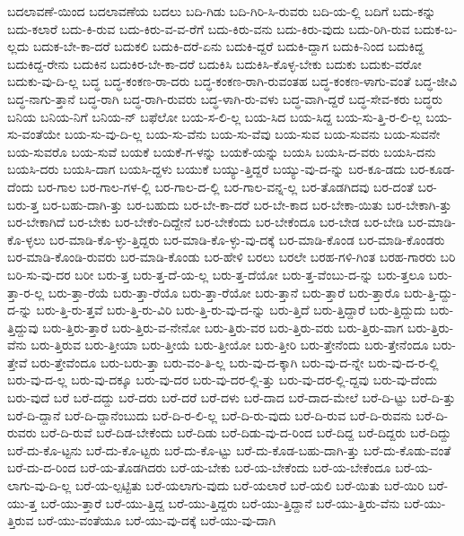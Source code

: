 {ಬದಲಾವಣೆ-ಯಿಂದ
ಬದಲಾವಣೆಯ
ಬದಲು
ಬದಿ-ಗಿಡು
ಬದಿ-ಗಿರಿ-ಸಿ-ರುವರು
ಬದಿ-ಯ-ಲ್ಲಿ
ಬದಿಗೆ
ಬದು-ಕನ್ನು
ಬದು-ಕಲಾರೆ
ಬದು-ಕಿ-ರುವ
ಬದು-ಕಿರು-ವ-ವ-ರೆಗೆ
ಬದು-ಕಿರು-ವನು
ಬದು-ಕಿರು-ವುದು
ಬದು-ರಿಗಿ-ರುವ
ಬದುಕ-ಬ-ಲ್ಲದು
ಬದುಕ-ಬೇ-ಕಾ-ದರೆ
ಬದುಕಲಿ
ಬದುಕಿ-ದರೆ-ಏನು
ಬದುಕಿ-ದ್ದರೆ
ಬದುಕಿ-ದ್ದಾಗ
ಬದುಕಿ-ನಿಂದ
ಬದುಕಿದ್ದ
ಬದುಕಿದ್ದ-ರೇನು
ಬದುಕಿನ
ಬದುಕಿರ-ಬೇ-ಕಾ-ದರೆ
ಬದುಕಿಸಿ
ಬದುಕಿಸಿ-ಕೊಳ್ಳ-ಬೇಕು
ಬದುಕು
ಬದುಕು-ವರೋ
ಬದುಕು-ವು-ದಿ-ಲ್ಲ
ಬದ್ಧ
ಬದ್ಧ-ಕಂಕಣ-ರಾ-ದರು
ಬದ್ಧ-ಕಂಕಣ-ರಾಗಿ-ರುವಂತಹ
ಬದ್ಧ-ಕಂಕಣ-ಳಾಗು-ವಂತೆ
ಬದ್ಧ-ಜೀವಿ
ಬದ್ಧ-ನಾಗು-ತ್ತಾನೆ
ಬದ್ಧ-ರಾಗಿ
ಬದ್ಧ-ರಾಗಿ-ರುವರು
ಬದ್ಧ-ಳಾಗಿ-ರು-ವಳು
ಬದ್ಧ-ವಾಗಿ-ದ್ದರೆ
ಬದ್ಧ-ಸೇವ-ಕರು
ಬದ್ಧರು
ಬನಿಯ
ಬನಿಯ-ನಿಗೆ
ಬನಿಯ-ನ್
ಬಫೆಲೋ
ಬಯ-ಸ-ಲಿ-ಲ್ಲ
ಬಯ-ಸಿದ
ಬಯ-ಸಿದ್ದ
ಬಯ-ಸು-ತ್ತಿ-ರ-ಲಿ-ಲ್ಲ
ಬಯ-ಸು-ವಂತೆಯೇ
ಬಯ-ಸು-ವು-ದಿ-ಲ್ಲ
ಬಯ-ಸು-ವೆನು
ಬಯ-ಸು-ವೆವು
ಬಯ-ಸುವ
ಬಯ-ಸುವನು
ಬಯ-ಸುವನೇ
ಬಯ-ಸುವರೊ
ಬಯ-ಸುವೆ
ಬಯಕೆ
ಬಯಕೆ-ಗ-ಳನ್ನು
ಬಯಕೆ-ಯನ್ನು
ಬಯಸಿ
ಬಯಸಿ-ದ-ವರು
ಬಯಸಿ-ದನು
ಬಯಸಿ-ದರು
ಬಯಸಿ-ದಾಗ
ಬಯಸಿ-ದ್ದಳು
ಬಯುಕೆ
ಬಯ್ಯು-ತ್ತಿದ್ದರೆ
ಬಯ್ಯು-ವು-ದ-ನ್ನು
ಬರ-ಕೂ-ಡದು
ಬರ-ಕೂಡ-ದೆಂದು
ಬರ-ಗಾಲ
ಬರ-ಗಾಲ-ಗಳ-ಲ್ಲಿ
ಬರ-ಗಾಲ-ದ-ಲ್ಲಿ
ಬರ-ಗಾಲ-ವನ್ನ-ಲ್ಲ
ಬರ-ತೊಡಗಿದವು
ಬರ-ದಂತೆ
ಬರ-ಬರು-ತ್ತ
ಬರ-ಬಹು-ದಾಗಿ-ತ್ತು
ಬರ-ಬಹುದು
ಬರ-ಬೇ-ಕಾ-ದರೆ
ಬರ-ಬೇ-ಕಾದ
ಬರ-ಬೇಕಾ-ಯಿತು
ಬರ-ಬೇಕಾಗಿ-ತ್ತು
ಬರ-ಬೇಕಾಗಿದೆ
ಬರ-ಬೇಕು
ಬರ-ಬೇಕೆಂ-ದಿದ್ದೇನೆ
ಬರ-ಬೇಕೆಂದು
ಬರ-ಬೇಕೆಂದೂ
ಬರ-ಬೇಡ
ಬರ-ಬೇಡಿ
ಬರ-ಮಾಡಿ-ಕೊ-ಳ್ಳಲು
ಬರ-ಮಾಡಿ-ಕೊ-ಳ್ಳು-ತ್ತಿದ್ದರು
ಬರ-ಮಾಡಿ-ಕೊ-ಳ್ಳು-ವು-ದಕ್ಕೆ
ಬರ-ಮಾಡಿ-ಕೊಂಡ
ಬರ-ಮಾಡಿ-ಕೊಂಡರು
ಬರ-ಮಾಡಿ-ಕೊಂಡಿ-ರುವರು
ಬರ-ಮಾಡಿ-ಕೊಂಡು
ಬರ-ಹೇಳಿ
ಬರಲು
ಬರಲೇ
ಬರಹ-ಗಳಿ-ಗಿಂತ
ಬರಹ-ಗಾರರು
ಬರಿ
ಬರಿ-ಸು-ವು-ದರ
ಬರೀ
ಬರು-ತ್ತ
ಬರು-ತ್ತ-ದೆ-ಯ-ಲ್ಲ
ಬರು-ತ್ತ-ದೆಯೋ
ಬರು-ತ್ತ-ವೆಂಬು-ದ-ನ್ನು
ಬರು-ತ್ತಲೂ
ಬರು-ತ್ತಾ-ರ-ಲ್ಲ
ಬರು-ತ್ತಾ-ರೆಯೆ
ಬರು-ತ್ತಾ-ರೆಯೊ
ಬರು-ತ್ತಾ-ರೆಯೋ
ಬರು-ತ್ತಾನೆ
ಬರು-ತ್ತಾರೆ
ಬರು-ತ್ತಾರೊ
ಬರು-ತ್ತಿ-ದ್ದು-ದ-ನ್ನು
ಬರು-ತ್ತಿ-ರು-ತ್ತವೆ
ಬರು-ತ್ತಿ-ರು-ವಿರಿ
ಬರು-ತ್ತಿ-ರು-ವು-ದ-ನ್ನು
ಬರು-ತ್ತಿದೆ
ಬರು-ತ್ತಿದ್ದಾರೆ
ಬರು-ತ್ತಿದ್ದುದು
ಬರು-ತ್ತಿದ್ದುವು
ಬರು-ತ್ತಿರು-ತ್ತಾರೆ
ಬರು-ತ್ತಿರು-ವ-ನೇನೋ
ಬರು-ತ್ತಿರು-ವರ
ಬರು-ತ್ತಿರು-ವರು
ಬರು-ತ್ತಿರು-ವಾಗ
ಬರು-ತ್ತಿರು-ವೆನು
ಬರು-ತ್ತಿರುವ
ಬರು-ತ್ತೀಯಾ
ಬರು-ತ್ತೀಯೆ
ಬರು-ತ್ತೀಯೋ
ಬರು-ತ್ತೀರಿ
ಬರು-ತ್ತೇನೆಂದು
ಬರು-ತ್ತೇನೆಂದೂ
ಬರು-ತ್ತೇವೆ
ಬರು-ತ್ತೇವೆಂದೂ
ಬರು-ಬರು-ತ್ತಾ
ಬರು-ವಂ-ತಿ-ಲ್ಲ
ಬರು-ವು-ದ-ಕ್ಕಾಗಿ
ಬರು-ವು-ದ-ನ್ನೇ
ಬರು-ವು-ದ-ರ-ಲ್ಲಿ
ಬರು-ವು-ದ-ಲ್ಲ
ಬರು-ವು-ದಕ್ಕೂ
ಬರು-ವು-ದರ
ಬರು-ವು-ದರ-ಲ್ಲಿ-ತ್ತು
ಬರು-ವು-ದರ-ಲ್ಲಿ-ದ್ದವು
ಬರು-ವು-ದೆಂದು
ಬರು-ವುದೆ
ಬರೆ
ಬರೆ-ದದ್ದು
ಬರೆ-ದರು
ಬರೆ-ದರೆ
ಬರೆ-ದಳು
ಬರೆ-ದಾದ
ಬರೆ-ದಾದ-ಮೇಲೆ
ಬರೆ-ದಿ-ಟ್ಟು
ಬರೆ-ದಿ-ತ್ತು
ಬರೆ-ದಿ-ದ್ದಾನೆ
ಬರೆ-ದಿ-ದ್ದಾನೆಂಬುದು
ಬರೆ-ದಿ-ರ-ಲಿ-ಲ್ಲ
ಬರೆ-ದಿ-ರು-ವುದು
ಬರೆ-ದಿ-ರುವ
ಬರೆ-ದಿ-ರುವನು
ಬರೆ-ದಿ-ರುವರು
ಬರೆ-ದಿ-ರುವೆ
ಬರೆ-ದಿಡ-ಬೇಕೆಂದು
ಬರೆ-ದಿಡು
ಬರೆ-ದಿಡು-ವು-ದ-ರಿಂದ
ಬರೆ-ದಿದ್ದ
ಬರೆ-ದಿದ್ದರು
ಬರೆ-ದಿದ್ದು
ಬರೆ-ದು-ಕೊ-ಟ್ಟನು
ಬರೆ-ದು-ಕೊ-ಟ್ಟರು
ಬರೆ-ದು-ಕೊ-ಟ್ಟು
ಬರೆ-ದು-ಕೊಡ-ಬಹು-ದಾಗಿ-ತ್ತು
ಬರೆ-ದು-ಕೊಡು-ವಂತೆ
ಬರೆ-ದು-ದ-ರಿಂದ
ಬರೆ-ಯ-ತೊಡಗಿದರು
ಬರೆ-ಯ-ಬೇಕು
ಬರೆ-ಯ-ಬೇಕೆಂದು
ಬರೆ-ಯ-ಬೇಕೆಂದೂ
ಬರೆ-ಯ-ಲಾಗು-ವು-ದಿ-ಲ್ಲ
ಬರೆ-ಯ-ಲ್ಪಟ್ಟಿತು
ಬರೆ-ಯಲಾಗು-ವುದು
ಬರೆ-ಯಲಾರೆ
ಬರೆ-ಯಲಿ
ಬರೆ-ಯಿತು
ಬರೆ-ಯಿರಿ
ಬರೆ-ಯು-ತ್ತ
ಬರೆ-ಯು-ತ್ತಾರೆ
ಬರೆ-ಯು-ತ್ತಿದ್ದ
ಬರೆ-ಯು-ತ್ತಿದ್ದರು
ಬರೆ-ಯು-ತ್ತಿದ್ದಾನೆ
ಬರೆ-ಯು-ತ್ತಿರು-ವೆನು
ಬರೆ-ಯು-ತ್ತಿರುವ
ಬರೆ-ಯು-ವಂತೆಯೂ
ಬರೆ-ಯು-ವು-ದಕ್ಕೆ
ಬರೆ-ಯು-ವು-ದಾಗಿ
}
